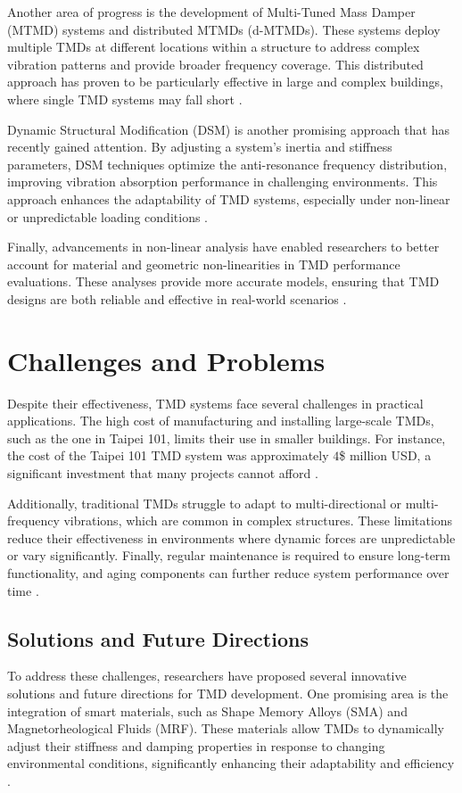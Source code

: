 \documentclass[twocolumn]{article}
\begin{document}
Another area of progress is the development of Multi-Tuned Mass Damper (MTMD) systems and distributed MTMDs (d-MTMDs). These systems deploy multiple TMDs at different locations within a structure to address complex vibration patterns and provide broader frequency coverage. This distributed approach has proven to be particularly effective in large and complex buildings, where single TMD systems may fall short \cite{richiedei_beyond_2022}.

Dynamic Structural Modification (DSM) is another promising approach that has recently gained attention. By adjusting a system's inertia and stiffness parameters, DSM techniques optimize the anti-resonance frequency distribution, improving vibration absorption performance in challenging environments. This approach enhances the adaptability of TMD systems, especially under non-linear or unpredictable loading conditions \cite{gutierrez_soto_tuned_2013}.

Finally, advancements in non-linear analysis have enabled researchers to better account for material and geometric non-linearities in TMD performance evaluations. These analyses provide more accurate models, ensuring that TMD designs are both reliable and effective in real-world scenarios \cite{elias_research_2017}\cite{gutierrez_soto_tuned_2013}.

\section{Challenges and Problems}
Despite their effectiveness, TMD systems face several challenges in practical applications. The high cost of manufacturing and installing large-scale TMDs, such as the one in Taipei 101, limits their use in smaller buildings. For instance, the cost of the Taipei 101 TMD system was approximately $4$\$ million USD, a significant investment that many projects cannot afford \cite{richiedei_beyond_2022}\cite{elias_research_2017}.

Additionally, traditional TMDs struggle to adapt to multi-directional or multi-frequency vibrations, which are common in complex structures. These limitations reduce their effectiveness in environments where dynamic forces are unpredictable or vary significantly. Finally, regular maintenance is required to ensure long-term functionality, and aging components can further reduce system performance over time \cite{elias_research_2017}\cite{gutierrez_soto_tuned_2013}.

\subsection{Solutions and Future Directions}
To address these challenges, researchers have proposed several innovative solutions and future directions for TMD development. One promising area is the integration of smart materials, such as Shape Memory Alloys (SMA) and Magnetorheological Fluids (MRF). These materials allow TMDs to dynamically adjust their stiffness and damping properties in response to changing environmental conditions, significantly enhancing their adaptability and efficiency \cite{richiedei_beyond_2022}\cite{gutierrez_soto_tuned_2013}.
\end{document}
